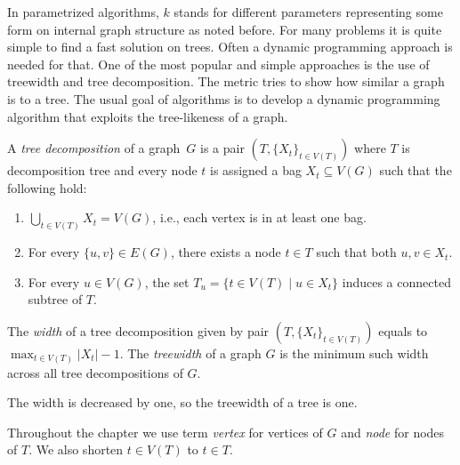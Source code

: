 In parametrized algorithms, \( k \) stands for different parameters
representing some form on internal graph structure as noted before.
%
For many problems it is quite simple to find a fast solution on trees.
Often a dynamic programming approach is needed for that.
%
One of the most popular and simple approaches
is the use of treewidth and tree decomposition.
The metric tries to show how similar a graph is to a tree.
%
The usual goal of algorithms is to develop a dynamic programming algorithm
that exploits the tree-likeness of a graph.

%
\begin{definition}
	A \emph{tree decomposition} of a graph~\( G \) is
	a pair \( (T, {\{X_t\}}_{t \in V ( T )}) \)
	where \( T \) is decomposition tree and every node \( t \)
	is assigned a bag \( X_t \subseteq V(G) \) such that the following hold:
	\begin{enumerate}
		\item \( \bigcup_{t \in V(T)} X_t = V(G) \),
		      i.e., each vertex is in at least one bag.
		\item For every \( \{u,v\} \in E(G) \), there exists
		      a node \( t \in T \) such that both \( u, v \in X_t \).
		\item For every \( u \in V(G) \),
		      the set \( T_u = \{t \in V(T) \mid u \in X_t\} \)
		      induces a connected subtree of \( T \).
	\end{enumerate}
\end{definition}
%
\begin{definition}
	The \emph{width} of a tree decomposition given by pair
	\( (T, {\{X_t\}}_{t \in V ( T )}) \)
	equals to \( \max_{t\in V(T)} |X_t| - 1 \).
	The \emph{treewidth} of a graph \( G \) is the minimum such width
	across all tree decompositions of \( G \).
\end{definition}
%
The width is decreased by one, so the treewidth of a tree is one.

Throughout the chapter we use term \emph{vertex} for vertices of \( G \)
and \emph{node} for nodes of \( T \).
We also shorten \( t \in V(T) \) to \( t \in T \).


